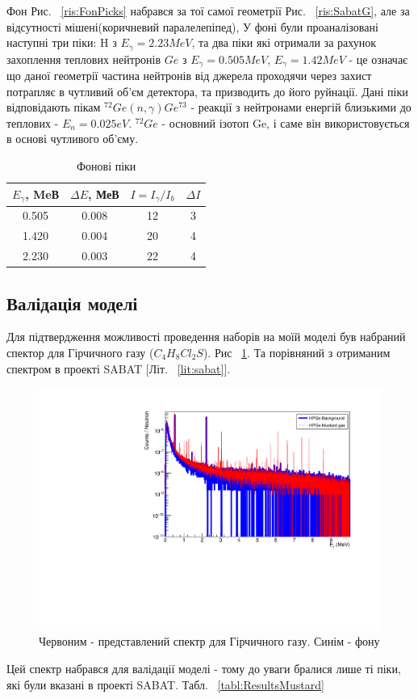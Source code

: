 \documentclass[a4paper, 14pt]{article}
\numberwithin{equation}{section}
\numberwithin{table}{section}
\begin{document}
Фон Рис. ~\ref{ris:FonPicks} набрався за тої самої геометрії Рис. ~\ref{ris:SabatG}, але за відсутності мішені(коричневий паралелепіпед), У фоні були проаналізовані наступні три піки: H з $E_\gamma = 2.23 MeV$, та два піки які отримали за рахунок захоплення теплових нейтронів $Ge$ з $E_\gamma = 0.505MeV$, $E_\gamma = 1.42 MeV$ - це означає що даної геометрії частина нейтронів від джерела проходячи через захист потрапляє в чутливий об'єм детектора, та призводить до його руйнації. Дані піки відповідають пікам $^{72}Ge(n, \gamma)Ge^{73}$ - реакції з нейтронами енергій близькими до теплових - $E_n = 0.025eV$. $^{72}Ge$ - основний ізотоп Ge, і саме він використовується в основі чутливого об'єму.
\begin{table}[h]
	\centering
	\begin{tabular}{|c|c|c|c|} 
		\hline
		$E_{\gamma}$, MeВ & $\Delta{E}$, МеВ & $I = I_{\gamma} / I_{b}$ & $\Delta{I}$\\
		\hline
		0.505 & 0.008 & 12 & 3 \\
		\hline
		1.420 & 0.004 & 20 & 4 \\	
		\hline
		2.230 & 0.003 & 22 & 4 \\	
		\hline
	\end{tabular}
	\caption{Фонові піки} 
	\label{tabl:ResultsBackground}
\end{table}

\subsection{Валідація моделі}

Для підтвердження можливості проведення наборів на моїй моделі був набраний спектор для Гірчичного газу ($C_4H_8Cl_2S$). Рис ~\ref{ris:MustBackAllLogSm}. Та порівняний з отриманим спектром в проекті SABAT [Літ. ~\ref{lit:sabat}].
\begin{figure}[hbt!]
	\centering \includegraphics[width=1\textwidth]{res/smMustFonAll.pdf}
	\caption{Червоним - представлений спектр для Гірчичного газу. Синім - фону} 
	\label{ris:MustBackAllLogSm}	
\end{figure} 
Цей спектр набрався для валідації моделі - тому до уваги бралися лише ті піки, які були вказані в проекті SABAT. Табл. ~\ref{tabl:ResultsMustard}
\end{document}
